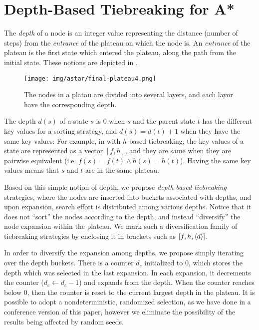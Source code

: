 \section{Depth-Based Tiebreaking for A*}

\label{sec:depth}

The \emph{depth} of a node is an integer value representing the distance
(number of steps) from the \emph{entrance} of the plateau on which the node is.
An \emph{entrance} of the plateau is the first state which entered the
plateau, along the path from the initial state. These notions are depicted
in .

\begin{figure}[htbp]
 \texttt{[image: img/astar/final-plateau4.png]}
 \caption{The nodes in a platau are divided into several layers,
 and each layor have the corresponding depth.}
 \label{fig:plateau-depiction}
\end{figure}

The depth $d(s)$ of a
state $s$ is 0 when $s$ and the parent state $t$ has the different key
values for a sorting strategy, and $d(s)=d(t)+1$ when they have the same
key values: For example, in \astar with $h$-based tiebreaking, the key
values of a state are represented as a vector $[f,h]$, and they are same
when they are pairwise equivalent (i.e. $f(s) = f(t) \land h(s) =
h(t)$).  Having the same key values means that $s$ and $t$ are in the
same plateau. 

Based on this simple notion of depth, we propose \emph{depth-based
tiebreaking} strategies, where the nodes are inserted into buckets
associated with depths, and upon expansion, search effort is distributed
among various depths. Notice that it does not ``sort'' the nodes
according to the depth, and instead ``diversify'' the node expansion
within the plateau. We mark such a diversification family of
tiebreaking strategies by enclosing it in brackets such as $[f,h,{\left<d\right>}]$.

In order to diversify the expansion among depths, we propose simply
iterating over the depth buckets. There is a counter $d_c$ initialized
to 0, which stores the depth which was selected in the last expansion.
In each expansion, it decrements the counter ($d_c\leftarrow d_c-1$) and
expands from the depth. When the counter reaches below 0, then the
counter is reset to the current largest depth in the plateau.
It is possible to adopt a
nondeterministic, randomized selection, as we have done in a conference
version of this paper, however we eliminate the possibility of the
results being affected by random seeds.

